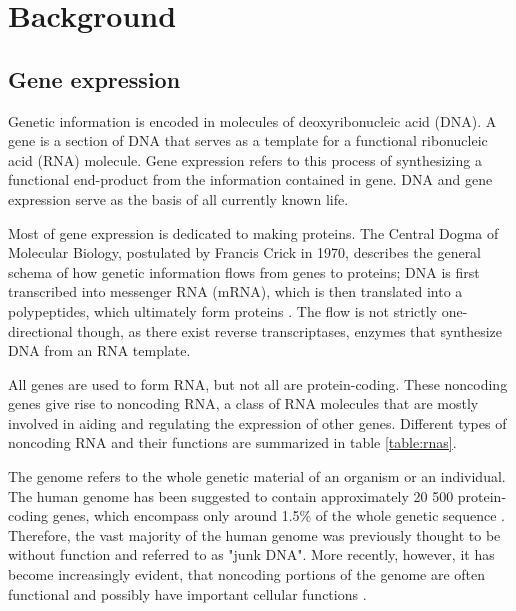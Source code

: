 

\section{Background}\label{background}











\subsection{Gene expression}\label{gene-expression}

Genetic information is encoded in molecules of deoxyribonucleic acid (DNA). A
gene is a section of DNA that serves as a template for a functional
ribonucleic acid (RNA) molecule. Gene expression refers to this process of
synthesizing a functional end-product from the information contained in gene.
DNA and gene expression serve as the basis of all currently known life.

Most of gene expression is dedicated to making proteins. The Central Dogma of
Molecular Biology, postulated by Francis Crick in 1970, describes the general
schema of how genetic information flows from genes to proteins; DNA is first
transcribed into messenger RNA (mRNA), which is then translated into a polypeptides,
which ultimately form proteins \citep{Crick1970}. The flow is not strictly
one-directional though, as there exist reverse transcriptases, enzymes that
synthesize DNA from an RNA template.

All genes are used to form RNA, but not all are protein-coding. These
noncoding genes give rise to noncoding RNA, a class of RNA molecules that
are mostly involved in aiding and regulating the expression of other genes.
Different types of noncoding RNA and their functions are summarized in
table \ref{table:rnas}.

The genome refers to the whole genetic material of an organism or an individual.
The human genome has been suggested to contain approximately 20 500 protein-coding
genes, which encompass only around 1.5\% of the whole genetic sequence
\citep{Clamp2007}. Therefore, the vast majority of the human genome was previously thought
to be without function and referred to as "junk DNA". More recently, however,
it has become increasingly evident, that noncoding portions of the genome
are often functional and possibly have important cellular functions \citep{ENCODE}.




